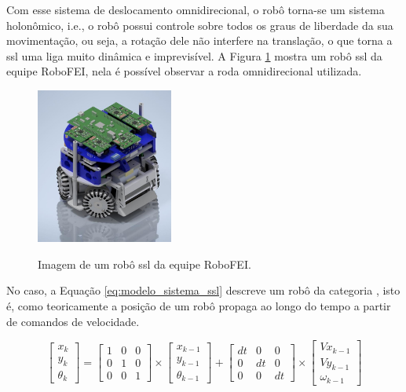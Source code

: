 \documentclass[acronym, symbols, table]{fei}
\begin{document}
		Com esse sistema de deslocamento omnidirecional, o robô torna-se um sistema holonômico, i.e., o robô possui controle sobre todos os graus de liberdade da sua movimentação, ou seja, a rotação dele não interfere na translação, o que torna a \acrshort{ssl} uma liga muito dinâmica e imprevisível. A Figura \ref{fig:exemplo_robo_ssl} mostra um robô \acrshort{ssl} da equipe RoboFEI, nela é possível observar a roda omnidirecional utilizada.
		
		\begin{figure}[!htb]
			\centering
			\caption{Imagem de um robô \acrshort{ssl} da equipe RoboFEI.} 
			\includegraphics[width=0.4\textwidth]{Foto_Robo_2012.jpg}
			\label{fig:exemplo_robo_ssl}
		\end{figure}
		
		No caso, a Equação \ref{eq:modelo_sistema_ssl} descreve um robô da categoria , isto é, como teoricamente a posição de um robô propaga ao longo do tempo a partir de comandos de velocidade.
		
		\begin{equation}\label{eq:modelo_sistema_ssl}
			\begin{bmatrix}
				x_k \\
				y_k \\
				\theta_k
			\end{bmatrix} = 
			\begin{bmatrix}
				1 & 0 & 0 \\
				0 & 1 & 0 \\
				0 & 0 & 1
			\end{bmatrix} \times
			\begin{bmatrix}
				x_{k-1} \\
				y_{k-1} \\
				\theta_{k-1}
			\end{bmatrix} + 
			\begin{bmatrix}
				dt & 0 & 0 \\
				0 & dt & 0 \\
				0 & 0 & dt
			\end{bmatrix} \times
			\begin{bmatrix}
				Vx_{k-1} \\
				Vy_{k-1} \\
				\omega_{k-1}
			\end{bmatrix}
		\end{equation}
		
\end{document}
